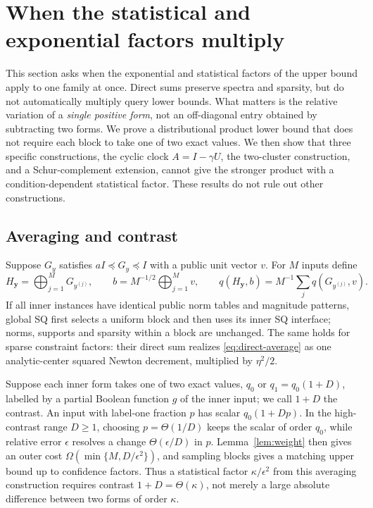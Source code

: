 \section{When the statistical and exponential factors multiply}\label{sec:composition}
This section asks when the exponential and statistical factors of the
upper bound apply to one family at once. Direct sums preserve spectra and
sparsity, but do not automatically multiply query lower bounds. What
matters is the relative variation of a \emph{single positive form}, not
an off-diagonal entry obtained by subtracting two forms. We prove a
distributional product lower bound that does not require each block to
take one of two exact values. We then show that three specific
constructions, the cyclic clock $A=I-\gamma U$, the two-cluster
construction, and a Schur-complement extension, cannot give the stronger
product with a condition-dependent statistical factor. These results do
not rule out other constructions.

\subsection{Averaging and contrast}
Suppose $G_y$ satisfies $aI\preceq G_y\preceq I$ with a public unit
vector $v$. For $M$ inputs define
\begin{equation}\label{eq:direct-average}
 H_{\boldsymbol y}=\bigoplus_{j=1}^M G_{y^{(j)}},\qquad
 b=M^{-1/2}\bigoplus_{j=1}^M v,
 \qquad q(H_{\boldsymbol y},b)=M^{-1}\sum_jq(G_{y^{(j)}},v).
\end{equation}
If all inner instances have identical public norm tables and magnitude
patterns, global SQ first selects a uniform block and then uses its
inner SQ interface; norms, supports and sparsity within a block are
unchanged. The same holds for sparse constraint factors: their direct sum realizes
\eqref{eq:direct-average} as one analytic-center squared Newton
decrement, multiplied by $\eta^2/2$.

Suppose each inner form takes one of two exact values, $q_0$ or
$q_1=q_0(1+D)$, labelled by a partial Boolean function $g$ of the inner
input; we call $1+D$ the contrast. An input with label-one fraction $p$
has scalar $q_0(1+Dp)$. In the high-contrast range $D\geq1$, choosing
$p=\Theta(1/D)$ keeps the scalar of order $q_0$, while relative error
$\epsilon$ resolves a change $\Theta(\epsilon/D)$ in $p$.
Lemma~\ref{lem:weight} then gives an outer cost
$\Omega(\min\{M,D/\epsilon^2\})$, and sampling blocks gives a matching
upper bound up to confidence factors. Thus a statistical factor
$\kappa/\epsilon^2$ from this averaging construction requires contrast
$1+D=\Theta(\kappa)$, not merely a large absolute difference between two
forms of order $\kappa$.

